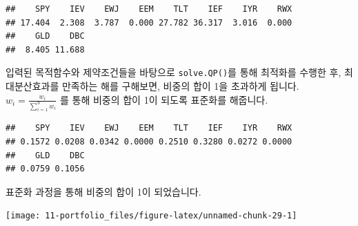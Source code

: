\documentclass[12pt,]{book}
\newenvironment{Shaded}{\begin{snugshade}}{\end{snugshade}}
\newcommand{\DataTypeTok}[1]{\textcolor[rgb]{0.13,0.29,0.53}{#1}}
\newcommand{\DecValTok}[1]{\textcolor[rgb]{0.00,0.00,0.81}{#1}}
\newcommand{\KeywordTok}[1]{\textcolor[rgb]{0.13,0.29,0.53}{\textbf{#1}}}
\newcommand{\NormalTok}[1]{#1}
\newcommand{\OperatorTok}[1]{\textcolor[rgb]{0.81,0.36,0.00}{\textbf{#1}}}
\newcommand{\OtherTok}[1]{\textcolor[rgb]{0.56,0.35,0.01}{#1}}
\newcommand{\StringTok}[1]{\textcolor[rgb]{0.31,0.60,0.02}{#1}}
\begin{document}
\begin{verbatim}
##    SPY    IEV    EWJ    EEM    TLT    IEF    IYR    RWX 
## 17.404  2.308  3.787  0.000 27.782 36.317  3.016  0.000 
##    GLD    DBC 
##  8.405 11.688
\end{verbatim}

입력된 목적함수와 제약조건들을 바탕으로 \texttt{solve.QP()}를 통해 최적화를 수행한 후, 최대분산효과를 만족하는 해를 구해보면, 비중의 합이 1을 초과하게 됩니다. \(w_i = \frac{w_i}{\sum_{i=1}^nw_i}\) 를 통해 비중의 합이 1이 되도록 표준화를 해줍니다.

\begin{Shaded}
\end{Shaded}

\begin{verbatim}
##    SPY    IEV    EWJ    EEM    TLT    IEF    IYR    RWX 
## 0.1572 0.0208 0.0342 0.0000 0.2510 0.3280 0.0272 0.0000 
##    GLD    DBC 
## 0.0759 0.1056
\end{verbatim}

표준화 과정을 통해 비중의 합이 1이 되었습니다.

\begin{Shaded}
\end{Shaded}

\begin{center}\texttt{[image: 11-portfolio\_files/figure-latex/unnamed-chunk-29-1]} \end{center}
\end{document}
